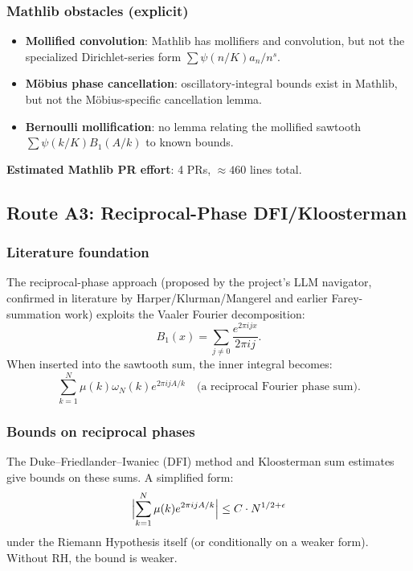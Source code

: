 \documentclass[11pt,a4paper]{article}
\begin{document}
\subsubsection{Mathlib obstacles (explicit)}

\begin{itemize}
\item \textbf{Mollified convolution}: Mathlib has mollifiers and convolution, but not the specialized Dirichlet-series form $\sum \psi(n/K) a_n / n^s$.
\item \textbf{Möbius phase cancellation}: oscillatory-integral bounds exist in Mathlib, but not the Möbius-specific cancellation lemma.
\item \textbf{Bernoulli mollification}: no lemma relating the mollified sawtooth $\sum \psi(k/K) B_1(A/k)$ to known bounds.
\end{itemize}

\textbf{Estimated Mathlib PR effort}: 4 PRs, $\approx 460$ lines total.

\subsection{Route A3: Reciprocal-Phase DFI/Kloosterman}

\subsubsection{Literature foundation}

The reciprocal-phase approach (proposed by the project's LLM navigator, confirmed in literature by Harper/Klurman/Mangerel and earlier Farey-summation work) exploits the Vaaler Fourier decomposition:
\[
B_1(x) = \sum_{j \ne 0} \frac{e^{2\pi i j x}}{2\pi i j}.
\]
When inserted into the sawtooth sum, the inner integral becomes:
\[
\sum_{k=1}^{N} \mu(k) \omega_N(k) e^{2\pi i j A / k} \quad \text{(a reciprocal Fourier phase sum)}.
\]

\subsubsection{Bounds on reciprocal phases}

The Duke--Friedlander--Iwaniec (DFI) method and Kloosterman sum estimates give bounds on these sums. A simplified form:
\[
\Bigl|\sum_{k=1}^{N} \mu(k) e^{2\pi i j A / k}\Bigr| \le C \cdot N^{1/2 + \epsilon}
\]
under the Riemann Hypothesis itself (or conditionally on a weaker form). Without RH, the bound is weaker.
\end{document}
